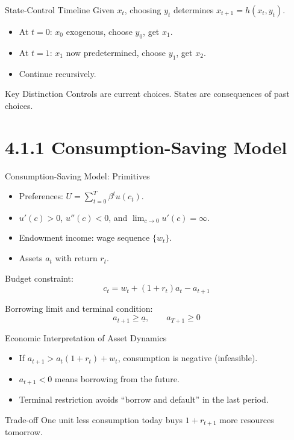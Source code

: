 \documentclass[aspectratio=169,10pt]{beamer}
\begin{document}
\begin{frame}{State-Control Timeline}
Given $x_t$, choosing $y_t$ determines $x_{t+1}=h(x_t,y_t)$.

\medskip
\begin{itemize}
  \item At $t=0$: $x_0$ exogenous, choose $y_0$, get $x_1$.
  \item At $t=1$: $x_1$ now predetermined, choose $y_1$, get $x_2$.
  \item Continue recursively.
\end{itemize}

\begin{block}{Key Distinction}
Controls are current choices. States are consequences of past choices.
\end{block}
\end{frame}

\section{4.1.1 Consumption-Saving Model}

\begin{frame}{Consumption-Saving Model: Primitives}
\begin{itemize}
  \item Preferences: $U=\sum_{t=0}^{T}\beta^t u(c_t)$.
  \item $u'(c)>0$, $u''(c)<0$, and $\lim_{c\to 0}u'(c)=\infty$.
  \item Endowment income: wage sequence $\{w_t\}$.
  \item Assets $a_t$ with return $r_t$.
\end{itemize}

Budget constraint:
\[
c_t=w_t+(1+r_t)a_t-a_{t+1}
\]

Borrowing limit and terminal condition:
\[
a_{t+1}\ge \underline{a},\qquad a_{T+1}\ge 0
\]
\end{frame}

\begin{frame}{Economic Interpretation of Asset Dynamics}
\begin{itemize}
  \item If $a_{t+1}>a_t(1+r_t)+w_t$, consumption is negative (infeasible).
  \item $a_{t+1}<0$ means borrowing from the future.
  \item Terminal restriction avoids ``borrow and default'' in the last period.
\end{itemize}

\begin{block}{Trade-off}
One unit less consumption today buys $1+r_{t+1}$ more resources tomorrow.
\end{block}
\end{frame}
\end{document}
